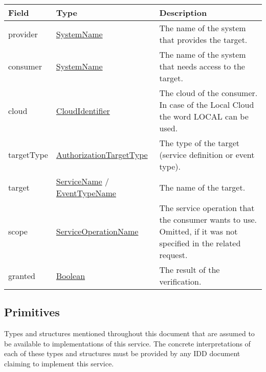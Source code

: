 \documentclass[a4paper]{arrowhead}
\newcommand{\pref}[1]{{\textcolor{ArrowheadGrey}{\hyperref[sec:model:primitives:#1]{#1}}}}
\begin{document}
\clearpage

 
\begin{table}[ht!]
\begin{tabularx}{\textwidth}{| p{4.25cm} | p{4cm} | X |} \hline
\rowcolor{gray!33} Field & Type      & Description \\ \hline
provider & \pref{SystemName} & The name of the system that provides the target. \\ \hline
consumer & \pref{SystemName} & The name of the system that needs access to the target. \\ \hline
cloud & \pref{CloudIdentifier} & The cloud of the consumer. In case of the Local Cloud the word LOCAL can be used. \\ \hline
targetType & \pref{AuthorizationTargetType} & The type of the target (service definition or event type). \\ \hline
target & \pref{ServiceName} / \pref{EventTypeName} & The name of the target. \\ \hline
scope & \pref{ServiceOperationName} & The service operation that the consumer wants to use. Omitted, if it was not specified in the related request. \\ \hline
granted & \pref{Boolean} & The result of the verification. \\ \hline
\end{tabularx}
\end{table}

\subsection{Primitives}
\label{sec:model:primitives}

Types and structures mentioned throughout this document that are assumed to be available to implementations of this service.
The concrete interpretations of each of these types and structures must be provided by any IDD document claiming to implement this service.
\end{document}
